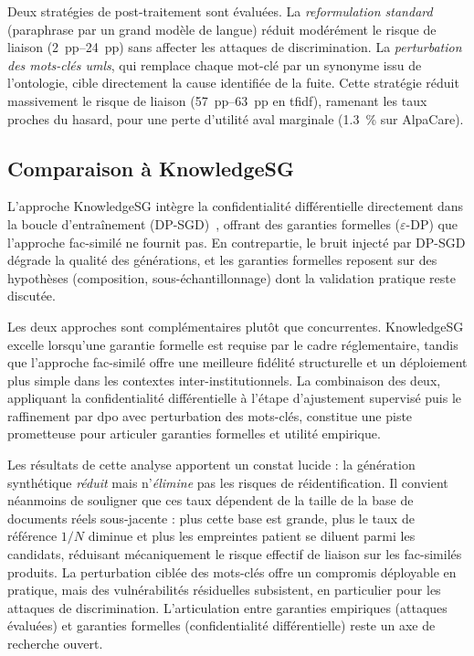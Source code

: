 Deux stratégies de post-traitement sont évaluées.
La \emph{reformulation standard}~\citep{igamberdiev2024rewriteagain} (paraphrase par un grand modèle de langue) réduit modérément le risque de liaison (\SIrange{2}{24}{pp}) sans affecter les attaques de discrimination.
La \emph{perturbation des mots-clés \gls{umls}}, qui remplace chaque mot-clé par un synonyme issu de l'ontologie, cible directement la cause identifiée de la fuite.
Cette stratégie réduit massivement le risque de liaison (\SIrange{57}{63}{pp} en \gls{tfidf}), ramenant les taux proches du hasard, pour une perte d'utilité aval marginale (\SI{1,3}{\percent} sur AlpaCare).

\subsection{Comparaison à KnowledgeSG}

L'approche KnowledgeSG \citep{wangKnowledgeSGPrivacyPreservingSynthetic2024} intègre la confidentialité différentielle directement dans la boucle d'entraînement (DP-SGD)~\citep{igamberdiev2023dpbart}, offrant des garanties formelles ($\varepsilon$-DP) que l'approche fac-similé ne fournit pas.
En contrepartie, le bruit injecté par DP-SGD dégrade la qualité des générations, et les garanties formelles reposent sur des hypothèses (composition, sous-échantillonnage) dont la validation pratique reste discutée.

Les deux approches sont complémentaires plutôt que concurrentes.
KnowledgeSG excelle lorsqu'une garantie formelle est requise par le cadre réglementaire, tandis que l'approche fac-similé offre une meilleure fidélité structurelle et un déploiement plus simple dans les contextes inter-institutionnels.
La combinaison des deux, appliquant la confidentialité différentielle à l'étape d'ajustement supervisé puis le raffinement par \gls{dpo} avec perturbation des mots-clés, constitue une piste prometteuse pour articuler garanties formelles et utilité empirique.

Les résultats de cette analyse apportent un constat lucide : la génération synthétique \emph{réduit} mais n'\emph{élimine} pas les risques de réidentification. Il convient néanmoins de souligner que ces taux dépendent de la taille de la base de documents réels sous-jacente : plus cette base est grande, plus le taux de référence $1/N$ diminue et plus les empreintes patient se diluent parmi les candidats, réduisant mécaniquement le risque effectif de liaison sur les fac-similés produits.
La perturbation ciblée des mots-clés offre un compromis déployable en pratique, mais des vulnérabilités résiduelles subsistent, en particulier pour les attaques de discrimination.
L'articulation entre garanties empiriques (attaques évaluées) et garanties formelles (confidentialité différentielle) reste un axe de recherche ouvert.
